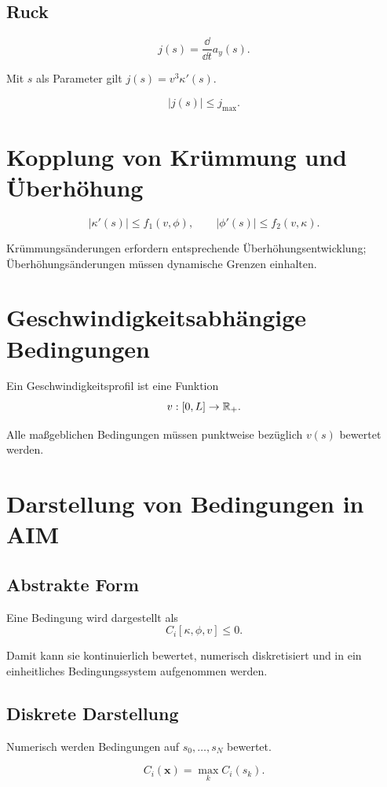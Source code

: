 \subsection{Ruck}
\begin{definition}[Ruck]
\[j(s)=\frac{\dd}{\dd t}a_y(s).\]
\end{definition}
Mit \(s\) als Parameter gilt \(j(s)=v^3\kappa'(s)\).
\begin{constraint}\[|j(s)|\leq j_{\max}.\]\end{constraint}

\section{Kopplung von Krümmung und Überhöhung}
\begin{constraint}
\[
|\kappa'(s)|\leq f_1(v,\phi),\qquad
|\phi'(s)|\leq f_2(v,\kappa).
\]
\end{constraint}
Krümmungsänderungen erfordern entsprechende Überhöhungsentwicklung;
Überhöhungsänderungen müssen dynamische Grenzen einhalten.

\section{Geschwindigkeitsabhängige Bedingungen}
\begin{definition}[Geschwindigkeitsprofil]
Ein Geschwindigkeitsprofil ist eine Funktion
\[
v:[0,L]\to\mathbb{R}_+.
\]
\end{definition}
Alle maßgeblichen Bedingungen müssen punktweise bezüglich \(v(s)\) bewertet
werden.

\section{Darstellung von Bedingungen in AIM}
\subsection{Abstrakte Form}
\begin{definition}[Bedingungsfunktional]
Eine Bedingung wird dargestellt als
\[
C_i[\kappa,\phi,v]\leq0.
\]
\end{definition}
Damit kann sie kontinuierlich bewertet, numerisch diskretisiert und in ein
einheitliches Bedingungssystem aufgenommen werden.

\subsection{Diskrete Darstellung}
Numerisch werden Bedingungen auf \(s_0,\dots,s_N\) bewertet.
\begin{definition}
\[
C_i(\mathbf x)=\max_k C_i(s_k).
\]
\end{definition}

